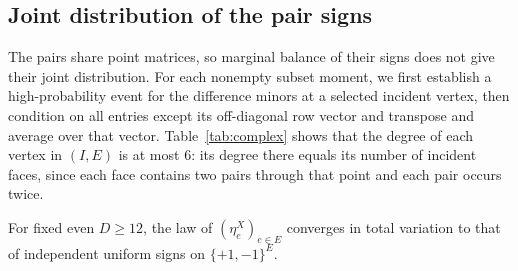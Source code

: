 \subsection{Joint distribution of the pair signs}

The pairs share point matrices, so marginal balance of their signs does
not give their joint distribution. For each nonempty subset moment,
we first establish a high-probability event for the difference minors
at a selected incident vertex, then condition on all entries except
its off-diagonal row vector and transpose and average over that vector.
Table~\ref{tab:complex} shows that the degree of each
vertex in $(I,E)$ is at most $6$:
its degree there equals its number of incident faces, since each face
contains two pairs through that point and each pair occurs twice.

\begin{lemma}
\label{lem:joint-signs}
For fixed even $D\geq12$, the law of $(\eta_e^X)_{e\in E}$ converges
in total variation to that of independent uniform signs on
$\{+1,-1\}^E$.
\end{lemma}

